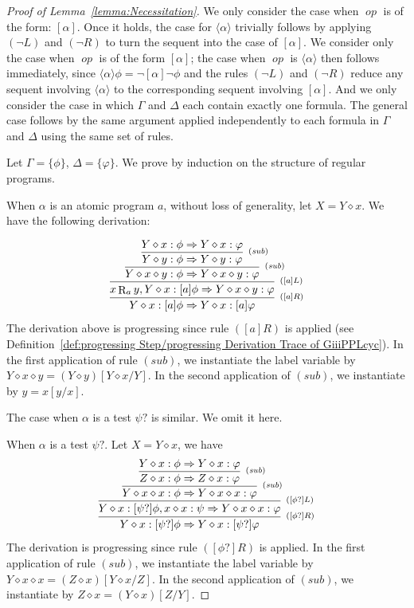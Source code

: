 \documentclass[manuscript,screen]{acmart}
\newcommand{\la}[0]{\langle}
\newcommand{\ra}[0]{\rangle}
\newcommand{\Sub}[0]{{\textit{sub}}}
\newcommand{\cat}[0]{\diamond}
\DeclareMathOperator{\op}{\mathit{op}}
\DeclareMathOperator{\R}{R}
\begin{document}
\begin{proof}[Proof of Lemma~\ref{lemma:Necessitation}]
\ifx
We only consider the case when $\op$ is of the form: $[\alpha]$. Once it holds, the case for $\la\alpha\ra$ trivially follows by applying $(\neg L)$ and $(\neg R)$ to turn the sequent into the case of $[\alpha]$. 
\fi
We consider only the case when $\op$ is of the form $[\alpha]$; the case when $\op$ is $\la\alpha\ra$ then follows immediately, since $\la\alpha\ra\phi = \neg[\alpha]\neg\phi$ and the rules $(\neg L)$ and $(\neg R)$ reduce any sequent involving $\la\alpha\ra$ to the corresponding sequent involving $[\alpha]$. 
And we only consider the case in which $\Gamma$ and $\Delta$ each contain exactly one formula. The general case follows by the same argument applied independently to each formula in $\Gamma$ and $\Delta$ using the same set of rules.


Let $\Gamma=\{\phi\}$, $\Delta=\{\varphi\}$. 
We prove by induction on the structure of regular programs. 

When $\alpha$ is an atomic program $a$, without loss of generality, let $X = Y\cat x$. 
We have the following derivation:

$$
\infer[^{([a]R)}]
{Y\cat x : [a]\phi\Rightarrow Y\cat x:[a]\varphi }
{
    \infer[^{([a]L)}]
    {x\R_a y, Y\cat x:[a]\phi\Rightarrow Y\cat x\cat y:\varphi}
    {
        \infer[^{(\Sub)}]
        {Y\cat x\cat y:\phi\Rightarrow Y\cat x\cat y:\varphi}
        {
            \infer[^{(\Sub)}]
            {Y\cat y : \phi\Rightarrow Y\cat y :\varphi}
            {
                Y\cat x:\phi\Rightarrow Y\cat x:\varphi
            }
        }
    }
}
$$
The derivation above is progressing since rule $([a]R)$ is applied (see Definition~\ref{def:progressing Step/progressing Derivation Trace of GiiiPPLcyc}). 
In the first application of rule $(\Sub)$, we instantiate the label variable by $Y\cat x\cat y = (Y\cat y)[Y\cat x/Y]$.  In the second application of $(\Sub)$, we instantiate by $y = x[y/x]$. 

The case when $\alpha$ is a test $\psi?$ is similar. We omit it here. 

\ifx
When $\alpha$ is a test $\psi?$. Let $X = Y\cat x$, we have
$$
\infer[^{([\phi?]R)}]
{Y \cat x: [\psi?]\phi\Rightarrow Y \cat x : [\psi?]\varphi }
{
    \infer[^{([\phi?]L)}]
    {Y\cat x: [\psi?]\phi, x\cat x:\psi\Rightarrow Y\cat x\cat x:\varphi}
    {
            \infer[^{(\Sub)}]
            {Y\cat x\cat x: \phi\Rightarrow Y\cat x\cat x:\varphi}
            {
                \infer[^{(\Sub)}]
                {Z\cat x : \phi\Rightarrow Z \cat x: \varphi}
                {Y\cat x : \phi\Rightarrow Y \cat x: \varphi}
            }
    }
}
$$
The derivation is progressing since rule $([\phi?]R)$ is applied. 
In the first application of rule $(\Sub)$, we instantiate the label variable by $Y\cat x\cat x = (Z\cat x)[Y\cat x/Z]$. 
In the second application of $(\Sub)$, we instantiate by $Z\cat x = (Y\cat x)[Z/Y]$. 
\fi


\end{proof}
\end{document}

